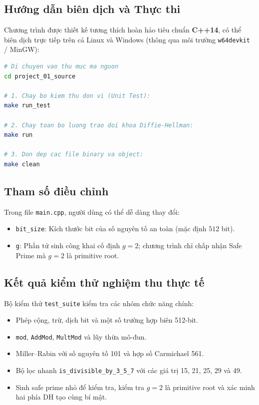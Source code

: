 \documentclass[12pt,a4paper]{article}
\theoremstyle{plain}
\begin{document}
\subsection{Hướng dẫn biên dịch và Thực thi}
Chương trình được thiết kế tương thích hoàn hảo tiêu chuẩn \textbf{C++14}, có thể biên dịch trực tiếp trên cả Linux và Windows (thông qua môi trường \texttt{w64devkit} / MinGW):

\begin{lstlisting}[language=bash]
# Di chuyen vao thu muc ma nguon
cd project_01_source

# 1. Chay bo kiem thu don vi (Unit Test):
make run_test

# 2. Chay toan bo luong trao doi khoa Diffie-Hellman:
make run

# 3. Don dep cac file binary va object:
make clean
\end{lstlisting}

\subsection{Tham số điều chỉnh}
Trong file \texttt{main.cpp}, người dùng có thể dễ dàng thay đổi:
\begin{itemize}
    \item \texttt{bit\_size}: Kích thước bit của số nguyên tố an toàn (mặc định $512$ bit).
    \item \texttt{g}: Phần tử sinh công khai cố định $g=2$; chương trình chỉ chấp nhận Safe Prime mà $g=2$ là primitive root.
\end{itemize}

\subsection{Kết quả kiểm thử nghiệm thu thực tế}
Bộ kiểm thử \texttt{test\_suite} kiểm tra các nhóm chức năng chính:
\begin{itemize}
    \item Phép cộng, trừ, dịch bit và một số trường hợp biên 512-bit.
    \item \texttt{mod}, \texttt{AddMod}, \texttt{MultMod} và lũy thừa mô-đun.
    \item Miller--Rabin với số nguyên tố 101 và hợp số Carmichael 561.
    \item Bộ lọc nhanh \texttt{is\_divisible\_by\_3\_5\_7} với các giá trị 15, 21, 25, 29 và 49.
    \item Sinh safe prime nhỏ để kiểm tra, kiểm tra $g = 2$ là primitive root và xác minh hai phía DH tạo cùng bí mật.
\end{itemize}
\end{document}
